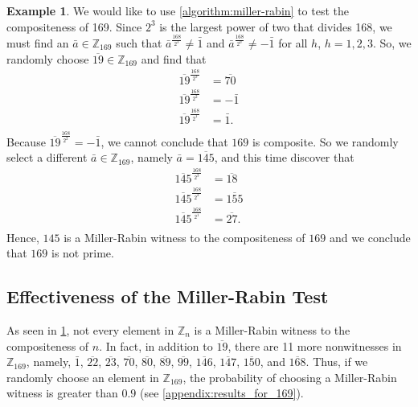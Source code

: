 \documentclass[10pt, titlepage]{amsart}
\newcommand\Z{{\mathbb Z}}
\theoremstyle{definition}
\newtheorem{example}{Example}[subsection]
\begin{document}
	
	
	\begin{example}\label{example:miller-rabin_test_169}
		We would like to use \cref{algorithm:miller-rabin} to test the compositeness of 169. Since $2^3$ is the largest power of two that divides 168, we must find an $\bar{a}\in \Z_{169}$ such that $\bar{a}^{\frac{168}{2^3}} \neq \bar{1}$ and $\bar{a}^{\frac{168}{2^h}} \neq -\bar{1}$ for all $h$, $h=1,2,3$. So, we randomly choose $\overline{19} \in \Z_{169}$ and find that
		\begin{align*}
			\overline{19}^{\frac{168}{2^3}} &= \overline{70} \\
			\overline{19}^{\frac{168}{2^2}} &= -\bar{1} \\
			\overline{19}^{\frac{168}{2^1}} &= \bar{1}. \\
		\end{align*}
		Because $\overline{19}^{\frac{168}{2^2}} = -\bar{1}$, we cannot conclude that $169$ is composite. So we randomly select a different $\bar{a} \in \Z_{169}$, namely $\bar{a} = \overline{145}$, and this time discover that
		\begin{align*}
		\overline{145}^{\frac{168}{2^3}} &= \overline{18} \\
		\overline{145}^{\frac{168}{2^2}} &= \overline{155} \\
		\overline{145}^{\frac{168}{2^1}} &= \overline{27}. \\
		\end{align*}
		Hence, $145$ is a Miller-Rabin witness to the compositeness of $169$ and we conclude that $169$ is not prime. 
	\end{example}
	
	
	\subsection{Effectiveness of the Miller-Rabin Test}	
	
	As seen in \cref{example:miller-rabin_test_169}, not every element in $\Z_n$ is a Miller-Rabin witness to the compositeness of $n$. In fact, in addition to $\overline{19}$, there are 11 more nonwitnesses in $\Z_{169}$, namely, $\bar{1}$, $\overline{22}$, $\overline{23}$, $\overline{70}$, $\overline{80}$, $\overline{89}$, $\overline{99}$, $\overline{146}$, $\overline{147}$, $\overline{150}$, and $\overline{168}$. Thus, if we randomly choose an element in $\Z_{169}$, the probability of choosing a Miller-Rabin witness is greater than $0.9$ (see \cref{appendix:results_for_169}).
	
\end{document}
